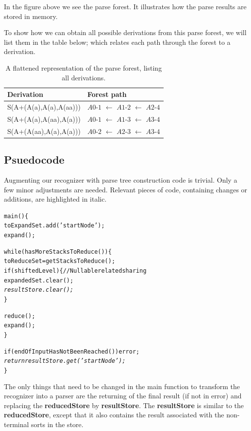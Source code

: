 \documentclass[a4paper,10pt]{article}
\begin{document}
In the figure above we see the parse forest. It illustrates how the parse results are stored in memory.

To show how we can obtain all possible derivations from this parse forest, we will list them in the table below; which relates each path through the forest to a derivation.

\begin{table}[H]
\centering
\begin{tabular}{ p{15em} p{15em} }
Derivation & Forest path\\
\hline
S(A+(A(a),A(a),A(aa))) & $A0$-$1$ $\leftarrow$ $A1$-$2$ $\leftarrow$ $A2$-$4$\\
S(A+(A(a),A(aa),A(a))) & $A0$-$1$ $\leftarrow$ $A1$-$3$ $\leftarrow$ $A3$-$4$\\
S(A+(A(aa),A(a),A(a))) & $A0$-$2$ $\leftarrow$ $A2$-$3$ $\leftarrow$ $A3$-$4$
\end{tabular}
\caption{A flattened representation of the parse forest, listing all derivations.}
\end{table}

\subsection{Psuedocode}

Augmenting our recognizer with parse tree construction code is trivial. Only a few minor adjustments are needed. Relevant pieces of code, containing changes or additions, are highlighted in italic.

{\small
\begin{alltt}
main()\{
  toExpandSet.add('startNode');
  expand();
  
  while(hasMoreStacksToReduce())\{
    toReduceSet = getStacksToReduce();
    if(shiftedLevel)\{ // Nullable related sharing
      expandedSet.clear();\textit{
      resultStore.clear();}
    \}
    
    reduce();
    expand();
  \}
  
  if(endOfInputHasNotBeenReached()) error;
  \textit{
  return resultStore.get('startNode');}
\}
\end{alltt}
}

The only things that need to be changed in the main function to transform the recognizer into a parser are the returning of the final result (if not in error) and replacing the {\bf reducedStore} by {\bf resultStore}. The {\bf resultStore} is similar to the {\bf reducedStore}, except that it also contains the result associated with the non-terminal sorts in the store.
\end{document}
